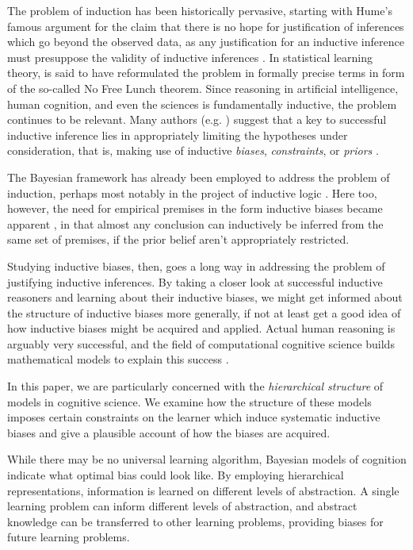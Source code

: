 \documentclass[11pt, a4paper]{article}
\begin{document}
The problem of induction has been historically pervasive, starting with Hume's
famous argument for the claim that there is no hope for justification of
inferences which go beyond the observed data, as any justification for an
inductive inference must presuppose the validity of inductive inferences
\citep{hume39_treat_human_natur,hume48_enquir_concer_human_under}. In
statistical learning theory,
\citet{wolpert96_lack_prior_distin_between_learn_algor} is said to have
reformulated the problem in formally precise terms in form of the so-called No
Free Lunch theorem. Since reasoning in artificial intelligence, human cognition,
and even the sciences is fundamentally inductive, the problem continues to be
relevant. Many authors (e.g. \citet{vapnik95_natur_statis_learn_theor}) suggest
that a key to successful inductive inference lies in appropriately limiting the
hypotheses under consideration, that is, making use of inductive \emph{biases},
\emph{constraints}, or \emph{priors} \citep{griffiths09_connec}.

The Bayesian framework has already been employed to address the problem of
induction, perhaps most notably in the project of inductive logic
\citep{carnap50_logic_found_probab}. Here too, however, the need for empirical
premises in the form inductive biases became apparent
\citep{henderson18_probl_induc}, in that almost any conclusion can inductively be inferred from the same
set of premises, if the prior belief aren't appropriately restricted.

Studying inductive biases, then, goes a long way in addressing the problem of
justifying inductive inferences. By taking a closer look at successful inductive reasoners and
learning about their inductive biases, we might get informed about the
structure of inductive biases more generally, if not at least get a good idea of
how inductive biases might be acquired and applied. Actual human reasoning is
arguably very successful, and the field of computational cognitive science
builds mathematical models to explain this success
\citep{tenenbaum11_how_to_grow_mind,griffiths10_probab_model_cognit}.

In this paper, we are particularly concerned with the \emph{hierarchical
  structure} of models in cognitive science. We examine how the structure of
these models imposes certain constraints on the learner which induce systematic
inductive biases and give a plausible account of how the biases are acquired.

While there may be no universal learning algorithm, Bayesian models of cognition
indicate what optimal bias could look like. By employing hierarchical
representations, information is learned on different levels of abstraction. A
single learning problem can inform different levels of abstraction, and abstract
knowledge can be transferred to other learning problems, providing biases for
future learning problems.
\end{document}
